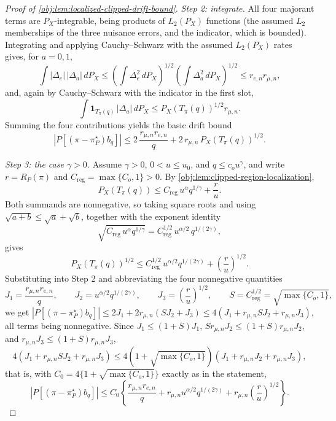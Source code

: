 \begin{proof}[Proof of \cref{obj:lem:localized-clipped-drift-bound}]
\emph{Step 2: integrate.}  All four majorant terms are \(P_X\)-integrable, being products of \(L_2(P_X)\) functions (the assumed \(L_2\) memberships of the three nuisance errors, and the indicator, which is bounded).  Integrating and applying Cauchy--Schwarz with the assumed \(L_2(P_X)\) rates gives, for \(a=0,1\),
\[
\int |\Delta_e|\,|\Delta_a|\,dP_X
   \le \left(\int\Delta_e^2\,dP_X\right)^{1/2}\left(\int\Delta_a^2\,dP_X\right)^{1/2}
   \le r_{e,n}r_{\mu,n},
\]
and, again by Cauchy--Schwarz with the indicator in the first slot,
\[
\int \mathbf 1_{T_\pi(q)}\,|\Delta_a|\,dP_X
\le
P_X\!\left(T_\pi(q)\right)^{1/2}r_{\mu,n}.
\]
Summing the four contributions yields the basic drift bound
\[
\left|P\!\left[(\pi-\pi^\star_P)b_q\right]\right|
\le
2\,\frac{r_{\mu,n}r_{e,n}}{q}
+
2\,r_{\mu,n}\,P_X\!\left(T_\pi(q)\right)^{1/2}.
\]

\emph{Step 3: the case \(\gamma>0\).}  Assume \(\gamma>0\), \(0<u\le u_0\), and \(q\le c_ou^\gamma\), and write \(r=R_P(\pi)\) and \(C_{\mathrm{reg}}=\max\{C_o,1\}>0\).  By \cref{obj:lem:clipped-region-localization},
\[
P_X\!\left(T_\pi(q)\right)
\le
C_{\mathrm{reg}}\,u^\alpha q^{1/\gamma}+\frac{r}{u}.
\]
Both summands are nonnegative, so taking square roots and using \(\sqrt{a+b}\le\sqrt a+\sqrt b\), together with the exponent identity
\[
\sqrt{C_{\mathrm{reg}}\,u^\alpha q^{1/\gamma}}
=
C_{\mathrm{reg}}^{1/2}\,u^{\alpha/2}\,q^{1/(2\gamma)},
\]
gives
\[
P_X\!\left(T_\pi(q)\right)^{1/2}
\le
C_{\mathrm{reg}}^{1/2}\,u^{\alpha/2}q^{1/(2\gamma)}
+
\left(\frac{r}{u}\right)^{1/2}.
\]
Substituting into Step 2 and abbreviating the four nonnegative quantities
\[
J_1=\frac{r_{\mu,n}r_{e,n}}{q},
\qquad
J_2=u^{\alpha/2}q^{1/(2\gamma)},
\qquad
J_3=\left(\frac{r}{u}\right)^{1/2},
\qquad
S=C_{\mathrm{reg}}^{1/2}=\sqrt{\max\{C_o,1\}},
\]
we get \(\left|P[(\pi-\pi^\star_P)b_q]\right|\le 2J_1+2r_{\mu,n}(SJ_2+J_3)\le 4\left(J_1+r_{\mu,n}SJ_2+r_{\mu,n}J_3\right)\), all terms being nonnegative.  Since \(J_1\le(1+S)J_1\), \(Sr_{\mu,n}J_2\le(1+S)r_{\mu,n}J_2\), and \(r_{\mu,n}J_3\le(1+S)r_{\mu,n}J_3\),
\[
4\left(J_1+r_{\mu,n}SJ_2+r_{\mu,n}J_3\right)
\le
4\left(1+\sqrt{\max\{C_o,1\}}\right)\left(J_1+r_{\mu,n}J_2+r_{\mu,n}J_3\right),
\]
that is, with \(C_0=4\{1+\sqrt{\max\{C_o,1\}}\}\) exactly as in the statement,
\[
\left|P\!\left[(\pi-\pi^\star_P)b_q\right]\right|
\le
C_0\left\{
\frac{r_{\mu,n}r_{e,n}}{q}
+
r_{\mu,n}u^{\alpha/2}q^{1/(2\gamma)}
+
r_{\mu,n}\left(\frac{r}{u}\right)^{1/2}
\right\}.
\]


\end{proof}
